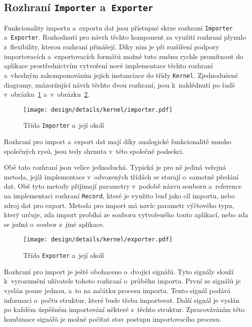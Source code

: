 		\subsection*{Rozhraní \texttt{Importer} a~\texttt{Exporter}}
		Funkcionality importu a~exportu dat jsou přístupné skrze rozhraní \texttt{Importer} a~\texttt{Exporter}. Rozhodnutí pro návrh těchto komponent za využití rozhraní plynulo z~flexibility, kterou rozhraní přinášejí. Díky nim je při rozšíření podpory importovacích a~exportovacích formátů možné tuto změnu rychle promítnout do aplikace prostřednictvím vytvoření nové implementace těchto rozhraní a~vhodným zakomponováním jejich instanciace do třídy \texttt{Kernel}. Zjednodušené diagramy, znázorňující návrh těchto dvou rozhraní, jsou k~nahlédnutí po řadě v~obrázku~\ref{fig:designDetailImporter} a~v~obrázku~\ref{fig:designDetailExporter}. \par
		\begin{figure}[H]
			\centering
			\texttt{[image: design/details/kernel/importer.pdf]}
			\caption{Třída \texttt{Importer} a~její okolí}
			\label{fig:designDetailImporter}
		\end{figure}
		Rozhraní pro import a~export dat mají díky analogické funkcionalitě mnoho společných rysů, jsou tedy shrnuta v~této společné podsekci.  \par
		Obě tato rozhraní jsou velice jednoduchá. Typická je pro ně jediná veřejná metoda, jejíž implementace v~odvozených třídách se starají o~samotné předání dat. Obě tyto metody přijímají parametry v~podobě názvu souboru a~reference na implementaci rozhraní \texttt{Record}, které je využito buď jako cíl importu, nebo zdroj dat pro export. Metoda pro import má navíc parametr výčtového typu, který určuje, zda import probíhá ze souboru vytvořeného touto aplikací, nebo zda se jedná o~soubor z~jiné aplikace.\par
		\begin{figure}[H]
			\centering
			\texttt{[image: design/details/kernel/exporter.pdf]}
			\caption{Třída \texttt{Exporter} a~její okolí}
			\label{fig:designDetailExporter}
		\end{figure}
		Rozhraní pro import je ještě obohaceno o~dvojici signálů. Tyto signály slouží k~vyrozumění uživatele tohoto rozhraní o~průběhu importu. První ze signálů je vyslán pouze jednou, a~to na začátku procesu importu. Tento signál podává informaci o~počtu struktur, které bude třeba importovat. Další signál je vyslán po každém úspěšném importování některé z~těchto struktur. Zpracováváním této kombinace signálů je možné počítat stav postupu importovacího procesu. \par
		

